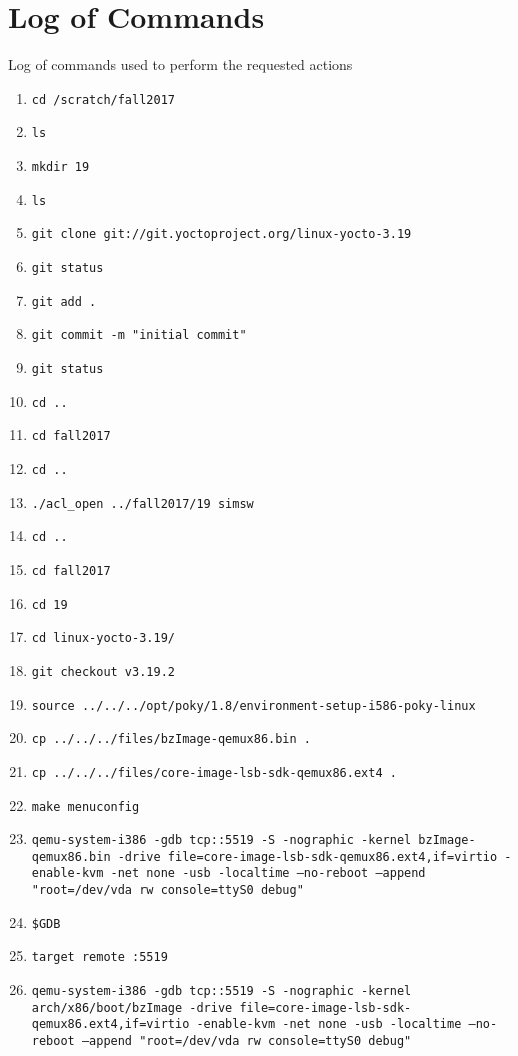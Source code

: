 \documentclass[10pt,letterpaper,draftclsnofoot,onecolumn]{IEEEtran}
\begin{document}
\section{Log of Commands}
\noindent Log of commands used to perform the requested actions
\begin{enumerate}
\item \texttt{cd /scratch/fall2017}
\item \texttt{ls}
\item \texttt{mkdir 19}
\item \texttt{ls}
\item \texttt{git clone git://git.yoctoproject.org/linux-yocto-3.19}
\item \texttt{git status}
\item \texttt{git add .}
\item \texttt{git commit -m "initial commit"}
\item \texttt{git status}
\item \texttt{cd ..}
\item \texttt{cd fall2017}
\item \texttt{cd ..}
\item \texttt{./acl\_open ../fall2017/19 simsw}
\item \texttt{cd ..}
\item \texttt{cd fall2017}
\item \texttt{cd 19}
\item \texttt{cd linux-yocto-3.19/}
\item \texttt{git checkout v3.19.2}
\item \texttt{source ../../../opt/poky/1.8/environment-setup-i586-poky-linux }
\item \texttt{cp ../../../files/bzImage-qemux86.bin .}
\item \texttt{cp ../../../files/core-image-lsb-sdk-qemux86.ext4 .}
\item \texttt{make menuconfig}
\item \texttt{qemu-system-i386 -gdb tcp::5519 -S -nographic -kernel bzImage-qemux86.bin -drive file=core-image-lsb-sdk-qemux86.ext4,if=virtio -enable-kvm -net none -usb -localtime --no-reboot --append "root=/dev/vda rw console=ttyS0 debug"}
\item \texttt{\$GDB}
\item \texttt{target remote :5519}
\item \texttt{qemu-system-i386 -gdb tcp::5519 -S -nographic -kernel arch/x86/boot/bzImage -drive file=core-image-lsb-sdk-qemux86.ext4,if=virtio -enable-kvm -net none -usb -localtime --no-reboot --append "root=/dev/vda rw console=ttyS0 debug"}
\end{enumerate}
\end{document}
